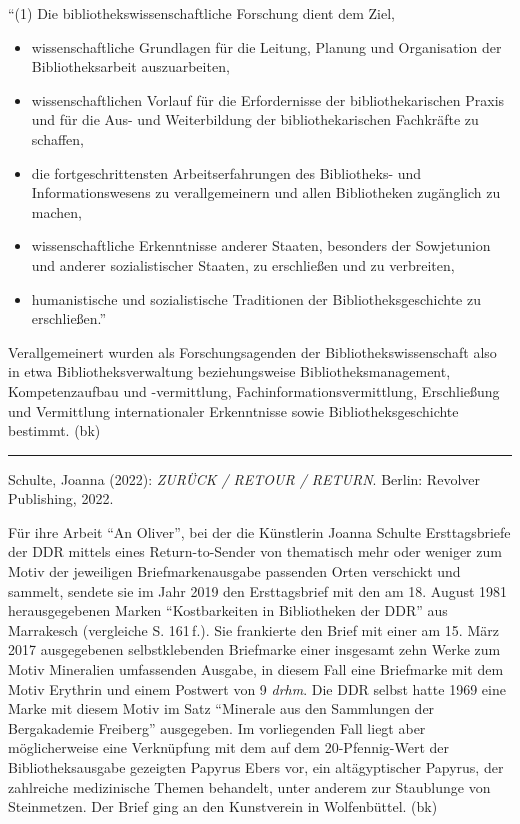 \documentclass[a4paper,
fontsize=11pt,
oneside,
numbers=noperiodatend,
parskip=half-,
bibliography=totoc,
final
]{scrartcl}
\begin{document}
``(1) Die bibliothekswissenschaftliche Forschung dient dem Ziel,

\begin{itemize}
\item
  wissenschaftliche Grundlagen für die Leitung, Planung und Organisation
  der Bibliotheksarbeit auszuarbeiten,
\item
  wissenschaftlichen Vorlauf für die Erfordernisse der
  bibliothekarischen Praxis und für die Aus- und Weiterbildung der
  bibliothekarischen Fachkräfte zu schaffen,
\item
  die fortgeschrittensten Arbeitserfahrungen des Bibliotheks- und
  Informationswesens zu verallgemeinern und allen Bibliotheken
  zugänglich zu machen,
\item
  wissenschaftliche Erkenntnisse anderer Staaten, besonders der
  Sowjetunion und anderer sozialistischer Staaten, zu erschließen und zu
  verbreiten,
\item
  humanistische und sozialistische Traditionen der Bibliotheksgeschichte
  zu erschließen.''
\end{itemize}

Verallgemeinert wurden als Forschungsagenden der Bibliothekswissenschaft
also in etwa Bibliotheksverwaltung beziehungsweise
Bibliotheksmanagement, Kompetenzaufbau und -vermittlung,
Fachinformationsvermittlung, Erschließung und Vermittlung
internationaler Erkenntnisse sowie Bibliotheksgeschichte bestimmt. (bk)

\begin{center}\rule{0.5\linewidth}{0.5pt}\end{center}

Schulte, Joanna (2022): \emph{ZURÜCK / RETOUR / RETURN}. Berlin:
Revolver Publishing, 2022.

Für ihre Arbeit \enquote{An Oliver}, bei der die Künstlerin Joanna
Schulte Ersttagsbriefe der DDR mittels eines Return-to-Sender von
thematisch mehr oder weniger zum Motiv der jeweiligen Briefmarkenausgabe
passenden Orten verschickt und sammelt, sendete sie im Jahr 2019 den
Ersttagsbrief mit den am 18. August 1981 herausgegebenen Marken
\enquote{Kostbarkeiten in Bibliotheken der DDR} aus Marrakesch
(vergleiche S. 161\,f.). Sie frankierte den Brief mit einer am 15. März
2017 ausgegebenen selbstklebenden Briefmarke einer insgesamt zehn Werke
zum Motiv Mineralien umfassenden Ausgabe, in diesem Fall eine Briefmarke
mit dem Motiv Erythrin und einem Postwert von 9 \emph{drhm}. Die DDR
selbst hatte 1969 eine Marke mit diesem Motiv im Satz \enquote{Minerale
aus den Sammlungen der Bergakademie Freiberg} ausgegeben. Im
vorliegenden Fall liegt aber möglicherweise eine Verknüpfung mit dem auf
dem 20-Pfennig-Wert der Bibliotheksausgabe gezeigten Papyrus Ebers vor,
ein altägyptischer Papyrus, der zahlreiche medizinische Themen
behandelt, unter anderem zur Staublunge von Steinmetzen. Der Brief ging
an den Kunstverein in Wolfenbüttel. (bk)

\end{document}
